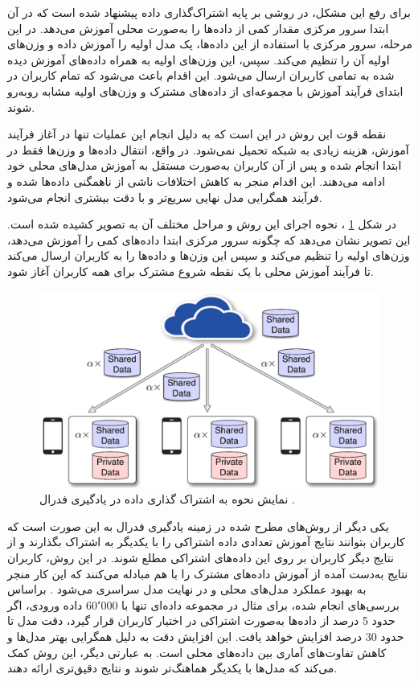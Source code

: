 برای رفع این مشکل، در
\cite{zhao2018federated}
روشی بر پایه اشتراک‌گذاری داده پیشنهاد شده است که در آن ابتدا سرور مرکزی مقدار کمی از داده‌ها را به‌صورت محلی آموزش می‌دهد. در این مرحله، سرور مرکزی با استفاده از این داده‌ها، یک مدل اولیه را آموزش داده و وزن‌های اولیه آن را تنظیم می‌کند. سپس، این وزن‌های اولیه به همراه داده‌های آموزش دیده شده به تمامی کاربران ارسال می‌شود. این اقدام باعث می‌شود که تمام کاربران در ابتدای فرآیند آموزش با مجموعه‌ای از داده‌های مشترک و وزن‌های اولیه مشابه روبه‌رو شوند.

نقطه قوت این روش در این است که به دلیل انجام این عملیات تنها در آغاز فرآیند آموزش، هزینه زیادی به شبکه تحمیل نمی‌شود. در واقع، انتقال داده‌ها و وزن‌ها فقط در ابتدا انجام شده و پس از آن کاربران به‌صورت مستقل به آموزش مدل‌های محلی خود ادامه می‌دهند. این اقدام منجر به کاهش اختلافات ناشی از ناهمگنی داده‌ها شده و فرآیند همگرایی مدل نهایی سریع‌تر و با دقت بیشتری انجام می‌شود.

در شکل
\ref{share_data}%
، نحوه اجرای این روش و مراحل مختلف آن به تصویر کشیده شده است. این تصویر نشان می‌دهد که چگونه سرور مرکزی ابتدا داده‌های کمی را آموزش می‌دهد، وزن‌های اولیه را تنظیم می‌کند و سپس این وزن‌ها و داده‌ها را به کاربران ارسال می‌کند تا فرآیند آموزش محلی با یک نقطه شروع مشترک برای همه کاربران آغاز شود.


\begin{figure}[b!]
	\centering
	\includegraphics[scale=0.9]{images/chap3/share_data.png}%
	\caption{%
		نمایش نحوه به اشتراک‌ گذاری داده در یادگیری فدرال
		\cite{zhao2018federated}%
		.
	}
	\label{share_data}
	\centering
\end{figure}


یکی دیگر از روش‌های مطرح شده در زمینه یادگیری فدرال به این صورت است که کاربران بتوانند نتایج آموزش تعدادی داده اشتراکی را با یکدیگر به اشتراک بگذارند و از نتایج دیگر کاربران بر روی این داده‌های اشتراکی مطلع شوند. در این روش، کاربران نتایج به‌دست آمده از آموزش داده‌های مشترک را با هم مبادله می‌کنند که این کار منجر به بهبود عملکرد مدل‌های محلی و در نهایت مدل سراسری می‌شود
\cite{collins2021exploiting}.
براساس بررسی‌های انجام شده، برای مثال در مجموعه داده‌ای تنها با 60٬000 داده ورودی، اگر حدود 5 درصد از داده‌ها به‌صورت اشتراکی در اختیار کاربران قرار گیرد، دقت مدل تا حدود 30 درصد افزایش خواهد یافت. این افزایش دقت به دلیل همگرایی بهتر مدل‌ها و کاهش تفاوت‌های آماری بین داده‌های محلی است. به عبارتی دیگر، این روش کمک می‌کند که مدل‌ها با یکدیگر هماهنگ‌تر شوند و نتایج دقیق‌تری ارائه دهند.


